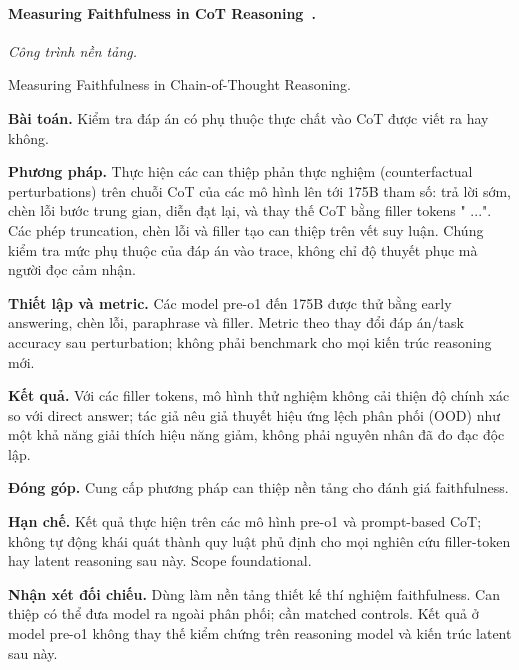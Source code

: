 \begin{samepage}
\paragraph{Measuring Faithfulness in CoT Reasoning~\cite{rra3_lanham_faithfulness}.}
\emph{Công trình nền tảng.}\par
{\raggedright\noindent\small Measuring Faithfulness in Chain-of-Thought Reasoning.\par}
\noindent\textbf{Bài toán.} Kiểm tra đáp án có phụ thuộc thực chất vào CoT được viết ra hay không.\par
\end{samepage}
\noindent\textbf{Phương pháp.} Thực hiện các can thiệp phản thực nghiệm (counterfactual perturbations) trên chuỗi CoT của các mô hình lên tới 175B tham số: trả lời sớm, chèn lỗi bước trung gian, diễn đạt lại, và thay thế CoT bằng filler tokens " ...". Các phép truncation, chèn lỗi và filler tạo can thiệp trên vết suy luận. Chúng kiểm tra mức phụ thuộc của đáp án vào trace, không chỉ độ thuyết phục mà người đọc cảm nhận.\par
\noindent\textbf{Thiết lập và metric.} Các model pre-o1 đến 175B được thử bằng early answering, chèn lỗi, paraphrase và filler. Metric theo thay đổi đáp án/task accuracy sau perturbation; không phải benchmark cho mọi kiến trúc reasoning mới.\par
\noindent\textbf{Kết quả.} Với các filler tokens, mô hình thử nghiệm không cải thiện độ chính xác so với direct answer; tác giả nêu giả thuyết hiệu ứng lệch phân phối (OOD) như một khả năng giải thích hiệu năng giảm, không phải nguyên nhân đã đo đạc độc lập.\par
\noindent\textbf{Đóng góp.} Cung cấp phương pháp can thiệp nền tảng cho đánh giá faithfulness.\par
\noindent\textbf{Hạn chế.} Kết quả thực hiện trên các mô hình pre-o1 và prompt-based CoT; không tự động khái quát thành quy luật phủ định cho mọi nghiên cứu filler-token hay latent reasoning sau này. Scope foundational.\par
\begin{samepage}
\noindent\textbf{Nhận xét đối chiếu.} Dùng làm nền tảng thiết kế thí nghiệm faithfulness. Can thiệp có thể đưa model ra ngoài phân phối; cần matched controls. Kết quả ở model pre-o1 không thay thế kiểm chứng trên reasoning model và kiến trúc latent sau này.\par
{}
\end{samepage}

